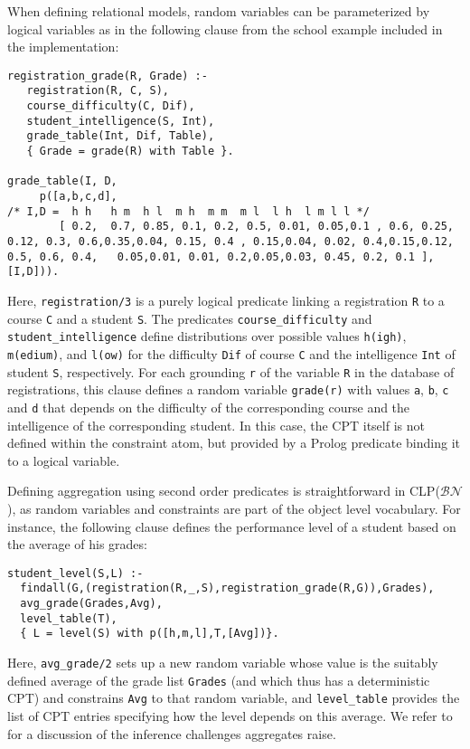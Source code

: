 \documentclass[a4paper]{article}
\newcommand{\clpbn}
  {CLP($\mathcal{BN}$)}
\begin{document}
When defining relational models, random variables can be parameterized
by logical variables as in the following clause from the school example
included in the implementation: 
\begin{verbatim}
registration_grade(R, Grade) :-
   registration(R, C, S),
   course_difficulty(C, Dif),
   student_intelligence(S, Int),
   grade_table(Int, Dif, Table),
   { Grade = grade(R) with Table }.

grade_table(I, D, 
     p([a,b,c,d],
/* I,D =  h h   h m  h l  m h  m m  m l  l h  l m l l */
        [ 0.2,  0.7, 0.85, 0.1, 0.2, 0.5, 0.01, 0.05,0.1 , 0.6, 0.25, 0.12, 0.3, 0.6,0.35,0.04, 0.15, 0.4 , 0.15,0.04, 0.02, 0.4,0.15,0.12, 0.5, 0.6, 0.4,   0.05,0.01, 0.01, 0.2,0.05,0.03, 0.45, 0.2, 0.1 ],[I,D])).
\end{verbatim}
Here, \texttt{registration/3} is a purely logical predicate
linking a registration \verb|R| to a course \verb|C| and a
student \verb|S|.  The predicates \texttt{course\_difficulty} and
\texttt{student\_intelligence} define distributions over possible
values \texttt{h(igh)}, \texttt{m(edium)}, and \texttt{l(ow)} for the
difficulty \texttt{Dif} of course \verb|C| and the intelligence 
\texttt{Int} of student \verb|S|, respectively. For each grounding \verb|r| of the variable
\verb|R| in the database of registrations, this clause defines a random
variable \verb|grade(r)| with values \verb|a|, \verb|b|, \verb|c| and \verb|d| that depends on the difficulty of the
corresponding course and the intelligence of the corresponding
student. In this case, the CPT itself is not defined within the
constraint atom, but provided by a Prolog predicate binding it to a
logical variable. 

Defining aggregation using second order predicates is straightforward
in \clpbn, as random variables
and constraints are part of the object level vocabulary. For instance,
the following clause defines the performance level of a student based
on the average of his grades:
\begin{verbatim}
student_level(S,L) :-
  findall(G,(registration(R,_,S),registration_grade(R,G)),Grades),
  avg_grade(Grades,Avg),
  level_table(T),
  { L = level(S) with p([h,m,l],T,[Avg])}.
\end{verbatim}
Here, \verb|avg_grade/2| sets up a new random variable
whose value is the suitably defined average of the grade list \verb|Grades| (and
which thus has a deterministic CPT) and constrains \verb|Avg| to that
random variable, and \verb|level_table| provides the 
list of CPT
entries specifying how the level depends on this average. We refer to
\cite{clpbn} for a discussion of the inference challenges aggregates
raise.   
\end{document}
